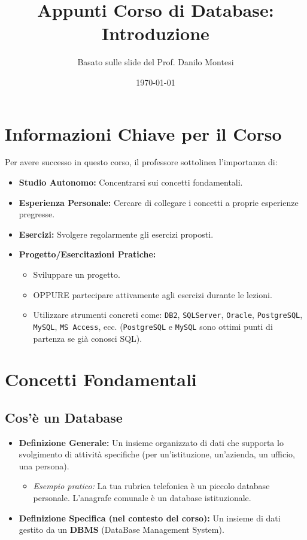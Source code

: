 \documentclass{article}
\title{Appunti Corso di Database: Introduzione}
\author{Basato sulle slide del Prof. Danilo Montesi}
\date{\today}
\begin{document}
	
	\maketitle
	\tableofcontents
	\newpage
	
	\section{Informazioni Chiave per il Corso}
	Per avere successo in questo corso, il professore sottolinea l'importanza di:
	\begin{itemize}
		\item \textbf{Studio Autonomo:} Concentrarsi sui concetti fondamentali.
		\item \textbf{Esperienza Personale:} Cercare di collegare i concetti a proprie esperienze pregresse.
		\item \textbf{Esercizi:} Svolgere regolarmente gli esercizi proposti.
		\item \textbf{Progetto/Esercitazioni Pratiche:}
		\begin{itemize}
			\item Sviluppare un progetto.
			\item OPPURE partecipare attivamente agli esercizi durante le lezioni.
			\item Utilizzare strumenti concreti come: \texttt{DB2}, \texttt{SQLServer}, \texttt{Oracle}, \texttt{PostgreSQL}, \texttt{MySQL}, \texttt{MS Access}, ecc. (\texttt{PostgreSQL} e \texttt{MySQL} sono ottimi punti di partenza se già conosci SQL).
		\end{itemize}
	\end{itemize}
	
	\section{Concetti Fondamentali}
	
	\subsection{Cos'è un Database}
	\begin{itemize}
		\item \textbf{Definizione Generale:} Un insieme organizzato di dati che supporta lo svolgimento di attività specifiche (per un'istituzione, un'azienda, un ufficio, una persona).
		\begin{itemize}
			\item \textit{Esempio pratico:} La tua rubrica telefonica è un piccolo database personale. L'anagrafe comunale è un database istituzionale.
		\end{itemize}
		\item \textbf{Definizione Specifica (nel contesto del corso):} Un insieme di dati gestito da un \textbf{DBMS} (DataBase Management System).
	\end{itemize}
	
\end{document}
